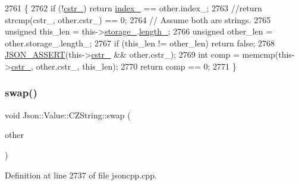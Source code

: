\begin{DoxyCode}
2761                                                           \{
2762   \textcolor{keywordflow}{if} (!\hyperlink{class_json_1_1_value_1_1_c_z_string_a5b4d28349294034d7f779c3c95d0306c}{cstr\_}) \textcolor{keywordflow}{return} \hyperlink{class_json_1_1_value_1_1_c_z_string_aecf29982235c9c165a0971023ebbb270}{index\_} == other.index\_;
2763   \textcolor{comment}{//return strcmp(cstr\_, other.cstr\_) == 0;}
2764   \textcolor{comment}{// Assume both are strings.}
2765   \textcolor{keywordtype}{unsigned} this\_len = this->\hyperlink{class_json_1_1_value_1_1_c_z_string_a17c92f0f089a4314e3b1d5695dc1a851}{storage\_}.\hyperlink{struct_json_1_1_value_1_1_c_z_string_1_1_string_storage_a165d865c44e6471d34668eeb4f15b140}{length\_};
2766   \textcolor{keywordtype}{unsigned} other\_len = other.storage\_.length\_;
2767   \textcolor{keywordflow}{if} (this\_len != other\_len) \textcolor{keywordflow}{return} \textcolor{keyword}{false};
2768   \hyperlink{json_8h_a188941dcc789ccb6539c3d6f41405582}{JSON\_ASSERT}(this->\hyperlink{class_json_1_1_value_1_1_c_z_string_a5b4d28349294034d7f779c3c95d0306c}{cstr\_} && other.cstr\_);
2769   \textcolor{keywordtype}{int} comp = memcmp(this->\hyperlink{class_json_1_1_value_1_1_c_z_string_a5b4d28349294034d7f779c3c95d0306c}{cstr\_}, other.cstr\_, this\_len);
2770   \textcolor{keywordflow}{return} comp == 0;
2771 \}
\end{DoxyCode}
\mbox{\label{class_json_1_1_value_1_1_c_z_string_ad59f3542d2eea749a6a63409d1a02207}} 
\subsubsection{\texorpdfstring{swap()}{swap()}}
{\footnotesize\ttfamily void Json\+::\+Value\+::\+C\+Z\+String\+::swap (\begin{DoxyParamCaption}\item[{\hyperlink{class_json_1_1_value_1_1_c_z_string}{C\+Z\+String} \&}]{other }\end{DoxyParamCaption})\hspace{0.3cm}{\ttfamily [private]}}



Definition at line 2737 of file jsoncpp.\+cpp.



